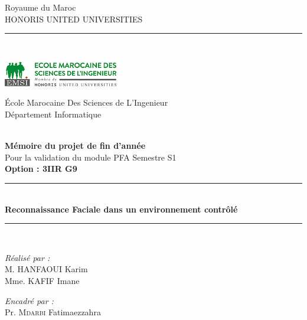\documentclass[a4paper,12pt]{report} %
\begin{document}
\begin{titlepage}
\centering
{\small Royaume du Maroc}\\
{\small HONORIS UNITED UNIVERSITIES}\\
\rule{\linewidth}{0.3mm} \\[0.4cm]

\begin{minipage}{5cm}
\begin{center}
\includegraphics[width=5cm]{logo.png}
\end{center}
\end{minipage}\hfill
\begin{minipage}{10cm}
\begin{flushright}
{\small École Marocaine Des Sciences de L'Ingenieur}\\[0.1cm]
{\small Département Informatique}\\[0.1cm]
\end{flushright}
\end{minipage}\hfill\\
\vspace{20mm}
{\large \bfseries Mémoire du projet de fin d’année}\\[0.5cm]
{\large Pour la validation du module PFA Semestre S1}\\[0.5cm]
{\large \bfseries{Option : 3IIR G9} \\ }
\vspace{10mm}
\rule{\linewidth}{0.3mm} \\[0.4cm]
{ \huge \bfseries Reconnaissance Faciale dans un environnement contrôlé\\[0.4cm] }
\rule{\linewidth}{0.3mm} \\[1cm]
\vspace{10mm}

\noindent
\begin{minipage}{0.5\textwidth}
\vspace{-7mm}
\begin{flushleft} \large
\emph{Réalisé par :}\\
M. \textsc{HANFAOUI} Karim \\
Mme. \textsc{KAFIF} Imane \\
\end{flushleft}
\end{minipage}
\begin{minipage}{0.4\textwidth}
\begin{flushright} \large
\emph{Encadré par :} \\
Pr. \textsc{Mdarbi} Fatimaezzahra \\
\end{flushright}
\end{minipage}\\[1cm]


\end{titlepage}
\end{document}
